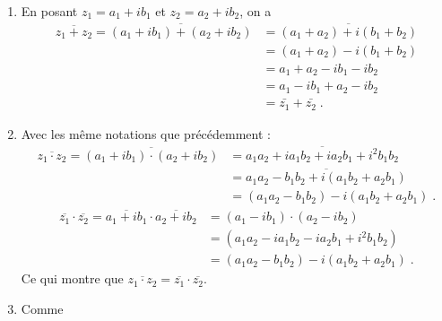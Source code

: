 \begin{corrige}
\begin{dem}
\begin{enumerate}
            \item En posant $z_1 = a_1 + i b_1$ et $z_2 = a_2 + i b_2$, on a 
                  \begin{align*}
                        \overline{z_1 + z_2} = \overline{(a_1 + i b_1) + (a_2 + i b_2)} 
                              & = \overline{(a_1 + a_2) + i (b_1 + b_2)}                          \\
                              & = (a_1 + a_2) - i (b_1 + b_2)                                     \\
                              & = a_1 + a_2 - i b_1 - i b_2                                       \\
                              & = a_1 - i b_1 + a_2 - i b_2                                       \\
                              & = \bar{z_1} + \bar{z_2}                                           \;.
                  \end{align*}
            \item Avec les m\^eme notations que pr\'ec\'edemment :
                  \begin{align*}
                        \overline{z_1 \cdot z_2} = \overline{(a_1 + i b_1) \cdot (a_2 + i b_2)}
                              & = \overline{ a_1 a_2 + i a_1 b_2 + i a_2 b_1 + i^2 b_1 b_2 }       \\
                              & = \overline{ a_1 a_2 - b_1 b_2 + i (a_1 b_2 + a_2 b_1) }           \\
                              & = (a_1 a_2 - b_1 b_2) - i (a_1 b_2 + a_2 b_1)                      \;.
                  \end{align*}
                  \begin{align*}
                        \overline{z_1} \cdot \overline{z_2} = \overline{ a_1 + i b_1 } \cdot \overline{ a_2 + i b_2 }
                              & = ( a_1 - i b_1 ) \cdot ( a_2 - i b_2 )                            \\
                              & = (a_1 a_2 - i a_1 b_2 - i a_2 b_1 + i^2 b_1 b_2)                  \\
                              & = (a_1 a_2 - b_1 b_2) - i (a_1 b_2 + a_2 b_1)                      \;.
                  \end{align*}
                  Ce qui montre que $\overline{z_1 \cdot z_2} = \overline{z_1} \cdot \overline{z_2}$.
            \item Comme

\end{enumerate}
\end{dem}
\end{corrige}
